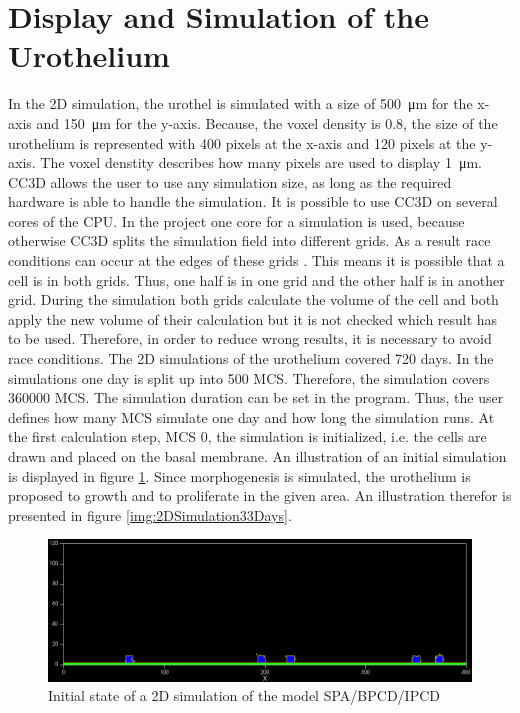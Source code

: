 \section{Display and Simulation of the Urothelium}
In the 2D simulation, the urothel is simulated with a size of \SI{500}{\micro\metre} for the x-axis and \SI{150}{\micro\metre} for the y-axis. Because, the voxel density is $0.8$, the size of the urothelium is represented with 400 pixels at the x-axis and 120 pixels at the y-axis. The voxel denstity describes how many pixels are used to display \SI{1}{\micro\metre}. \ac{CC3D} allows the user to use any simulation size, as long as the required hardware is able to handle the simulation. \newline
It is possible to use \ac{CC3D} on several cores of the CPU. In the project one core for a simulation is used, because otherwise \ac{CC3D} splits the simulation field into different grids. As a result race conditions can occur at the edges of these grids \cite{MaciejH.Swat2017}. This means it is possible that a cell is in both grids. Thus, one half is in one grid and the other half is in another grid. During the simulation both grids calculate the volume of the cell and both apply the new volume of their calculation but it is not checked which result has to be used. Therefore, in order to reduce wrong results, it is necessary to avoid race conditions. \newline 
The 2D simulations of the urothelium covered 720 days. In the simulations one day is split up into 500 \ac{MCS}. Therefore, the simulation covers 360000 \ac{MCS}. The simulation duration can be set in the program. Thus, the user defines how many \ac{MCS} simulate one day and how long the simulation runs. At the first calculation step, \ac{MCS} 0, the simulation is initialized, i.e. the cells are drawn and placed on the basal membrane. An illustration of an initial simulation is displayed in figure \ref{img:2DSimulationInitialState}. Since morphogenesis is simulated, the urothelium is proposed to growth and to proliferate in the given area. An illustration therefor is presented in figure \ref{img:2DSimulation33Days}.

\begin{figure}
	\center
	\includegraphics[scale=0.35]{figures/2DSimulation-InitialState.png}
	\caption{Initial state of a 2D simulation of the model SPA/BPCD/IPCD}
	\label{img:2DSimulationInitialState}
\end{figure}

